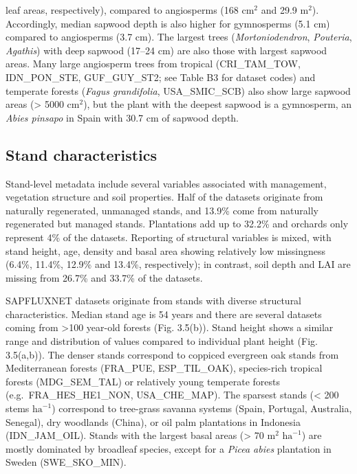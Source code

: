 \documentclass[11pt,twoside]{reedthesis}
\begin{document}
leaf areas, respectively), compared to angiosperms (168 \(\text{cm}^2\)
and 29.9 \(\text{m}^2\)). Accordingly, median sapwood depth is also
higher for gymnosperms (5.1 cm) compared to angiosperms (3.7 cm). The
largest trees (\emph{Mortoniodendron}, \emph{Pouteria}, \emph{Agathis})
with deep sapwood (17--24 cm) are also those with largest sapwood areas.
Many large angiosperm trees from tropical (CRI\_TAM\_TOW, IDN\_PON\_STE,
GUF\_GUY\_ST2; see Table B3 for dataset codes) and temperate forests
(\emph{Fagus grandifolia}, USA\_SMIC\_SCB) also show large sapwood areas
(\textgreater{} 5000 \(\text{cm}^2\)), but the plant with the deepest
sapwood is a gymnosperm, an \emph{Abies pinsapo} in Spain with 30.7 cm
of sapwood depth.\par

\subsection{Stand characteristics}\label{stand-characteristics}

Stand-level metadata include several variables associated with
management, vegetation structure and soil properties. Half of the
datasets originate from naturally regenerated, unmanaged stands, and
13.9\% come from naturally regenerated but managed stands. Plantations
add up to 32.2\% and orchards only represent 4\% of the datasets.
Reporting of structural variables is mixed, with stand height, age,
density and basal area showing relatively low missingness (6.4\%,
11.4\%, 12.9\% and 13.4\%, respectively); in contrast, soil depth and
LAI are missing from 26.7\% and 33.7\% of the datasets.\par

SAPFLUXNET datasets originate from stands with diverse structural
characteristics. Median stand age is 54 years and there are several
datasets coming from \textgreater{}100 year-old forests (Fig. 3.5(b)).
Stand height shows a similar range and distribution of values compared
to individual plant height (Fig. 3.5(a,b)). The denser stands correspond
to coppiced evergreen oak stands from Mediterranean forests (FRA\_PUE,
ESP\_TIL\_OAK), species-rich tropical forests (MDG\_SEM\_TAL) or
relatively young temperate forests (e.g.~FRA\_HES\_HE1\_NON,
USA\_CHE\_MAP). The sparsest stands (\textless{} 200 stems
\(\text{ha}^{-1}\)) correspond to tree-grass savanna systems (Spain,
Portugal, Australia, Senegal), dry woodlands (China), or oil palm
plantations in Indonesia (IDN\_JAM\_OIL). Stands with the largest basal
areas (\textgreater{} 70 \(\text{m}^2\) \(\text{ha}^{-1}\)) are mostly
dominated by broadleaf species, except for a \emph{Picea abies}
plantation in Sweden (SWE\_SKO\_MIN).\par
\end{document}

